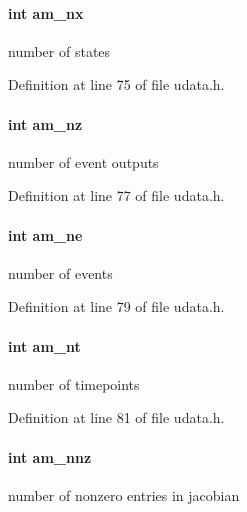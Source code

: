 \paragraph[{am\+\_\+nx}]{\setlength{\rightskip}{0pt plus 5cm}int am\+\_\+nx}\label{struct_user_data_a00ba9cf99f8f02b663241bb76b76ce96}
number of states 

Definition at line 75 of file udata.\+h.

\hypertarget{struct_user_data_af6f8dfb3615c37e31bc8a1b232d2c99e}{}
\paragraph[{am\+\_\+nz}]{\setlength{\rightskip}{0pt plus 5cm}int am\+\_\+nz}\label{struct_user_data_af6f8dfb3615c37e31bc8a1b232d2c99e}
number of event outputs 

Definition at line 77 of file udata.\+h.

\hypertarget{struct_user_data_a1ee2e63bd2b30c7196b4984014fbc3a4}{}
\paragraph[{am\+\_\+ne}]{\setlength{\rightskip}{0pt plus 5cm}int am\+\_\+ne}\label{struct_user_data_a1ee2e63bd2b30c7196b4984014fbc3a4}
number of events 

Definition at line 79 of file udata.\+h.

\hypertarget{struct_user_data_a08ea6ecb241cd86a6f171761a48e27dd}{}
\paragraph[{am\+\_\+nt}]{\setlength{\rightskip}{0pt plus 5cm}int am\+\_\+nt}\label{struct_user_data_a08ea6ecb241cd86a6f171761a48e27dd}
number of timepoints 

Definition at line 81 of file udata.\+h.

\hypertarget{struct_user_data_a43ad1c7f840dc744be4251902a4ae91d}{}
\paragraph[{am\+\_\+nnz}]{\setlength{\rightskip}{0pt plus 5cm}int am\+\_\+nnz}\label{struct_user_data_a43ad1c7f840dc744be4251902a4ae91d}
number of nonzero entries in jacobian 

